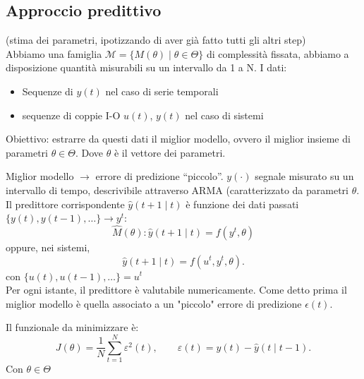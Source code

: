 \documentclass[11pt,a4paper]{article}
\begin{document}
\subsection{Approccio predittivo }
(stima dei parametri, ipotizzando di aver già fatto tutti gli altri step)\\
Abbiamo una famiglia $\mathcal{M}=\{M(\theta)\mid \theta\in\Theta\}$ di complessità fissata, abbiamo a disposizione quantità misurabili su un intervallo da 1 a N.
I dati: 
\begin{itemize}
    \item Sequenze di $y(t)$ nel caso di serie temporali
    \item sequenze di coppie I-O $u(t)$, $y(t)$ nel caso di sistemi
\end{itemize}

Obiettivo: estrarre da questi dati il miglior modello, ovvero il miglior insieme di parametri $\theta\in\Theta$. Dove $\theta$ è il vettore dei parametri. 

Miglior modello $\rightarrow$ errore di predizione ``piccolo''. 
$y(\cdot)$ segnale misurato su un intervallo di tempo, descrivibile attraverso ARMA (caratterizzato da parametri $\theta$.
Il predittore corrispondente $\hat y(t+1\mid t)$ è funzione dei dati passati $\{y(t),y(t-1),\dots\}\rightarrow y^t$: 
\[
\hat M(\theta)\colon \hat y(t+1\mid t)=f(y^t,\theta)
\]
oppure, nei sistemi,
\[
\hat y(t+1\mid t)=f(u^t,y^t,\theta).
\]
con $\{u(t),u(t-1),\dots\} = u^t$ \\
Per ogni istante, il predittore è valutabile numericamente. Come detto prima il miglior modello è quella associato a un "piccolo" errore di predizione $\epsilon(t)$. 

Il funzionale da minimizzare è:
\[
J(\theta)=\frac{1}{N}\sum_{t=1}^{N}\varepsilon^2(t),\qquad \varepsilon(t)=y(t)-\hat y(t\mid t-1).
\]
Con $\theta\in\Theta$
\end{document}
